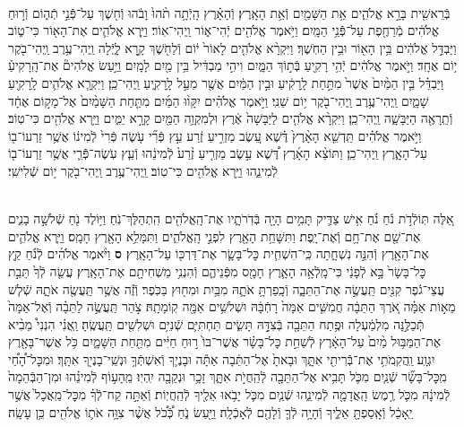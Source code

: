 \documentclass[twoside, openany, parskip=half, 11pt]{book}
\begin{document}
\begin{sometimes}
\begin{footnotesize}
\begin{multicols}{2}
\\
בְּֿרֵאשִׁ֖ית בָּרָ֣א אֱלֹהִ֑ים אֵ֥ת הַשָּׁמַ֖יִם וְֿאֵ֥ת הָאָֽרֶץ׃ וְֿהָאָ֗רֶץ הָֽיְֿתָ֥ה תֹ֨הוּ֙ וָבֹ֔הוּ וְֿח֖שֶׁךְ עַל־פְּֿֿנֵ֣י תְֿה֑וֹם וְֿר֣וּחַ אֱלֹהִ֔ים מְֿרַחֶ֖פֶת עַל־פְּֿֿנֵ֥י הַמָּֽיִם׃ וַיֹּ֥אמֶר אֱלֹהִ֖ים יְֿהִי־א֑וֹר וַֽיְהִי־אֽוֹר׃ וַיַּ֧רְא אֱלֹהִ֛ים אֶת־הָא֖וֹר כִּי־ט֑וֹב וַיַּבְדֵּ֣ל אֱלֹהִ֔ים בֵּ֥ין הָא֖וֹר וּבֵ֥ין הַחֹֽשֶׁךְ׃ וַיִּקְרָ֨א אֱלֹהִ֤ים לָאוֹר֙ י֔וֹם וְֿלַחֹ֖שֶׁךְ קָ֣רָא לָ֑יְֿלָה וַֽיְהִי־עֶ֥רֶב וַֽיְהִי־בֹ֖קֶר י֥וֹם אֶחָֽד׃
 וַיֹּ֣אמֶר אֱלֹהִ֔ים יְֿהִ֥י רָקִ֖יעַ בְּֿת֣וֹךְ הַמָּ֑יִם וִיהִ֣י מַבְדִּ֔יל בֵּ֥ין מַ֖יִם לָמָֽיִם׃ וַיַּ֣עַשׂ אֱלֹהִים֘ אֶת־הָֽרָקִיעַ֒ וַיַּבְדֵּ֗ל בֵּ֤ין הַמַּ֨יִם֙ אֲשֶׁר֙ מִתַּ֣חַת לָֽרָקִ֔יעַ וּבֵ֣ין הַמַּ֔יִם אֲשֶׁ֖ר מֵעַ֣ל לָֽרָקִ֑יעַ וַֽיְהִי־כֵֽן׃ וַיִּקְרָ֧א אֱלֹהִ֛ים לָֽרָקִ֖יעַ שָׁמָ֑יִם וַֽיְהִי־עֶ֥רֶב וַֽיְהִי־בֹ֖קֶר י֥וֹם שֵׁנִֽי׃
וַיֹּ֣אמֶר אֱלֹהִ֗ים יִקָּו֨וּ הַמַּ֜יִם מִתַּ֤חַת הַשָּׁמַ֨יִם֙ אֶל־מָק֣וֹם אֶחָ֔ד וְֿתֵֽרָאֶ֖ה הַיַּבָּשָׁ֑ה וַֽיְהִי־כֵֽן׃ וַיִּקְרָ֨א אֱלֹהִ֤ים לַיַּבָּשָׁה֙ אֶ֔רֶץ וּלְמִקְוֵ֥ה הַמַּ֖יִם קָרָ֣א יַמִּ֑ים וַיַּ֥רְא אֱלֹהִ֖ים כִּי־טֽוֹב׃ וַיֹּ֣אמֶר אֱלֹהִ֗ים תַּֽדְשֵׁ֤א הָאָ֨רֶץ֙ דֶּ֗שֶׁא עֵ֚שֶׂב מַזְרִ֣יעַ זֶ֔רַע עֵ֣ץ פְּֿרִ֞י עֹ֤שֶׂה פְּֿרִי֙ לְֿמִינ֔וֹ אֲשֶׁ֥ר זַרְעוֹ־ב֖וֹ עַל־הָאָ֑רֶץ וַֽיְהִי־כֵֽן׃ וַתּוֹצֵ֨א הָאָ֜רֶץ דֶּ֠שֶׁא עֵ֣שֶׂב מַזְרִ֤יעַ זֶ֨רַע֙ לְֿמִינֵ֔הוּ וְֿעֵ֧ץ עֹֽשֶׂה־פְּֿֿרִ֛י אֲשֶׁ֥ר זַרְעוֹ־ב֖וֹ לְֿמִינֵ֑הוּ וַיַּ֥רְא אֱלֹהִ֖ים כִּי־טֽוֹב׃ וַֽיְהִי־עֶ֥רֶב וַֽיְהִי־בֹ֖קֶר י֥וֹם שְֿׁלִישִֽׁי׃

\\
אֵ֚לֶּה תּֽוֹלְֿדֹ֣ת נֹ֔חַ נֹ֗חַ אִ֥ישׁ צַדִּ֛יק תָּמִ֥ים הָיָ֖ה בְּֿדֹֽרֹתָ֑יו אֶת־הָֽאֱלֹהִ֖ים הִֽתְהַלֶּךְ־נֹֽחַ׃ וַיּ֥וֹלֶד נֹ֖חַ שְֿׁלֹשָׁ֣ה בָנִ֑ים אֶת־שֵׁ֖ם אֶת־חָ֥ם וְֿאֶת־יָֽפֶת׃ וַתִּשָּׁחֵ֥ת הָאָ֖רֶץ לִפְנֵ֣י הָֽאֱלֹהִ֑ים וַתִּמָּלֵ֥א הָאָ֖רֶץ חָמָֽס׃ וַיַּ֧רְא אֱלֹהִ֛ים אֶת־הָאָ֖רֶץ וְֿהִנֵּ֣ה נִשְׁחָ֑תָה כִּֽי־הִשְׁחִ֧ית כׇּל־בָּשָׂ֛ר אֶת־דַּרְכּ֖וֹ עַל־הָאָֽרֶץ׃ \textbf{ס} וַיֹּ֨אמֶר אֱלֹהִ֜ים לְֿנֹ֗חַ קֵ֤ץ כׇּל־בָּשָׂר֙ בָּ֣א לְֿפָנַ֔י כִּי־מָֽלְֿאָ֥ה הָאָ֛רֶץ חָמָ֖ס מִפְּֿנֵיהֶ֑ם וְֿהִנְנִ֥י מַשְׁחִיתָ֖ם אֶת־הָאָֽרֶץ׃ עֲשֵׂ֤ה לְֿךָ֙ תֵּבַ֣ת עֲצֵי־גֹ֔פֶר קִנִּ֖ים תַּֽעֲשֶׂ֣ה אֶת־הַתֵּבָ֑ה וְֿכָֽפַרְתָּ֥ אֹתָ֛הּ מִבַּ֥יִת וּמִח֖וּץ בַּכֹּֽפֶר׃ וְֿזֶ֕ה אֲשֶׁ֥ר תַּֽעֲשֶׂ֖ה אֹתָ֑הּ שְֿׁל֧שׁ מֵא֣וֹת אַמָּ֗ה אֹ֚רֶךְ הַתֵּבָ֔ה חֲמִשִּׁ֤ים אַמָּה֙ רָחְֿבָּ֔הּ וּשְׁלשִׁ֥ים אַמָּ֖ה קֽוֹמָתָֽהּ׃ צֹ֣הַר תַּֽעֲשֶׂ֣ה לַתֵּבָ֗ה וְֿאֶל־אַמָּה֙ תְּֿכַלֶּ֣נָּה מִלְמַ֔עְלָה וּפֶ֥תַח הַתֵּבָ֖ה בְּֿצִדָּ֣הּ תָּשִׂ֑ים תַּחְתִּיִּ֛ם שְֿׁנִיִּ֥ם וּשְׁלִשִׁ֖ים תַּֽעֲשֶֽׂהָ׃  וַֽאֲנִ֗י הִנְנִי֩ מֵבִ֨יא אֶת־הַמַּבּ֥וּל מַ֨יִם֙ עַל־הָאָ֔רֶץ לְֿשַׁחֵ֣ת כׇּל־בָּשָׂ֗ר אֲשֶׁר־בּוֹ֙ ר֣וּחַ חַיִּ֔ים מִתַּ֖חַת הַשָּׁמָ֑יִם כֹּ֥ל אֲשֶׁר־בָּאָ֖רֶץ יִגְוָֽע׃ וַֽהֲקִֽמֹתִ֥י אֶת־בְּֿֿרִיתִ֖י אִתָּ֑ךְ וּבָאתָ֙ אֶל־הַתֵּ֔בָה אַתָּ֕ה וּבָנֶי֛ךָ וְֿאִשְׁתְּֿךָ֥ וּנְשֵֽׁי־בָנֶי֖ךָ אִתָּֽךְ׃ וּמִכׇּל־הָ֠חַ֠י מִֽכׇּל־בָּשָׂ֞ר שְֿׁנַ֧יִם מִכֹּ֛ל תָּבִ֥יא אֶל־הַתֵּבָ֖ה לְֿהַֽחֲיֹ֣ת אִתָּ֑ךְ זָכָ֥ר וּנְקֵבָ֖ה יִֽהְיֽוּ׃  מֵֽהָע֣וֹף לְֿמִינֵ֗הוּ וּמִן־הַבְּֿהֵמָה֙ לְֿמִינָ֔הּ מִכֹּ֛ל רֶ֥מֶשׂ הָֽאֲדָמָ֖ה לְֿמִינֵ֑הוּ שְֿׁנַ֧יִם מִכֹּ֛ל יָבֹ֥אוּ אֵלֶ֖יךָ לְֿהַֽחֲיֽוֹת׃ וְֿאַתָּ֣ה קַח־לְֿךָ֗ מִכׇּל־מַֽאֲכָל֙ אֲשֶׁ֣ר יֵֽאָכֵ֔ל וְֿאָֽסַפְתָּ֖ אֵלֶ֑יךָ וְֿהָיָ֥ה לְֿךָ֛ וְֿלָהֶ֖ם לְֿאָכְֿלָֽה׃ וַיַּ֖עַשׂ נֹ֑חַ כְּֿ֠כֹ֠ל אֲשֶׁ֨ר צִוָּ֥ה אֹת֛וֹ אֱלֹהִ֖ים כֵּ֥ן עָשָֽׂה׃


\end{multicols}
\end{footnotesize}
\end{sometimes}
\end{document}
